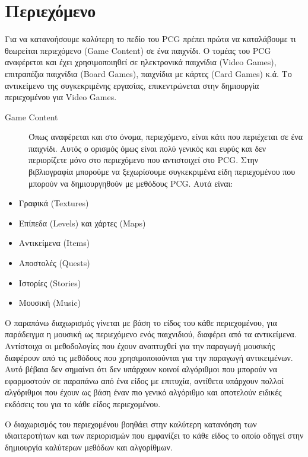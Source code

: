 \section{Περιεχόμενο}
Για να κατανοήσουμε καλύτερη το πεδίο του PCG πρέπει πρώτα να καταλάβουμε τι θεωρείται περιεχόμενο (Game Content) σε ένα παιχνίδι. Ο τομέας του PCG αναφέρεται και έχει χρησιμοποιηθεί σε ηλεκτρονικά παιχνίδια (Video Games), επιτραπέζια παιχνίδια (Board Games), παιχνίδια με κάρτες (Card Games) κ.ά. Το αντικείμενο της συγκεκριμένης εργασίας, επικεντρώνεται στην δημιουργία περιεχομένου για Video Games.

\begin{description}
\item [Game Content] Όπως αναφέρεται και στο όνομα, περιεχόμενο, είναι κάτι που περιέχεται σε ένα παιχνίδι. Αυτός ο ορισμός όμως είναι πολύ γενικός και ευρύς και δεν περιορίζετε μόνο στο περιεχόμενο που αντιστοιχεί στο PCG. Στην βιβλιογραφία μπορούμε να ξεχωρίσουμε συγκεκριμένα είδη περιεχομένου \cite{typesofcontent} που μπορούν να δημιουργηθούν με μεθόδους PCG. Αυτά είναι:
\end{description}

\begin{itemize}
  \item Γραφικά (Textures)
  \item Επίπεδα (Levels) και χάρτες (Maps)
   \item Αντικείμενα (Items)
   \item Αποστολές (Quests)
   \item Ιστορίες (Stories)
   \item Μουσική (Music)
\end{itemize}

Ο παραπάνω διαχωρισμός γίνεται με βάση το είδος του κάθε περιεχομένου, για παράδειγμα η μουσική ως περιεχόμενο ενός παιχνιδιού, διαφέρει από τα αντικείμενα. Αντίστοιχα οι μεθοδολογίες που έχουν αναπτυχθεί για την παραγωγή μουσικής διαφέρουν από τις μεθόδους που χρησιμοποιούνται για την παραγωγή αντικειμένων. Αυτό βέβαια δεν σημαίνει ότι δεν υπάρχουν κοινοί αλγόριθμοι που μπορούν να εφαρμοστούν σε παραπάνω από ένα είδος με επιτυχία, αντίθετα υπάρχουν πολλοί αλγόριθμοι που έχουν ως βάση έναν πιο γενικό αλγόριθμο και αποτελούν ειδικές εκδόσεις του για το κάθε είδος περιεχομένου.
\par
Ο διαχωρισμός του περιεχομένου βοηθάει στην καλύτερη κατανόηση των ιδιαιτεροτήτων και των περιορισμών που εμφανίζει το κάθε είδος το οποίο οδηγεί στην δημιουργία καλύτερων μεθόδων και αλγορίθμων.

